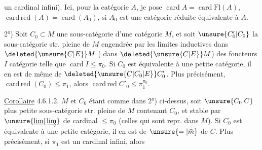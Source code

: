 un cardinal infini). Ici, pour la catégorie  $A$, je pose $\operatorname{card}A=\operatorname{card}\mathrm{Fl}(A)$,  $\operatorname{card\,red}(A)=\operatorname{card}(A_0)$, si $A_0$ est une catégorie réduite équivalente à $A$.

2°) Soit $C_0\subset M$ une sous-catégorie  d'une catégorie $M$,  et soit $\unsure{C'_0|C_0}$ la sous-catégorie str. pleine de $M$  engendrée par les limites inductives  dans $\deleted{\unsure{C|E}}M$ ( dans $\deleted{\unsure{C|E}}M$) des foncteurs
 $I$ catégorie telle que $\operatorname{card}\bar I\leq\pi_0$. Si $C_0$ est équivalente à une petite catégorie, il en est de même de $\deleted{\unsure{C|C_0|E}}C'_0$. Plus précisément, $\operatorname{card\,red}(C_0)\leq\pi_1$,  alors  $\operatorname{card\,red}C'_0\leq\pi_1^{\pi_0}$.

 \uline{Corollaire} 4.6.1.2. $M$ et $C_0$ étant comme dans 2°) ci-dessus, soit $\unsure{C_0|C}$  plus petite sous-catégorie str. pleine de $M$  contenant $C_0$, et stable par $\unsure{\underline{\lim}|\varinjlim}$ de cardinal $\leq\pi_0$ (celles qui sont repr. dans $M$). Si $C_0$ est équivalente à une petite catégorie, il en est de $\unsure{=|\bar m}$ de $C$. Plus précisément, si $\pi_1$ est un cardinal infini,  alors
